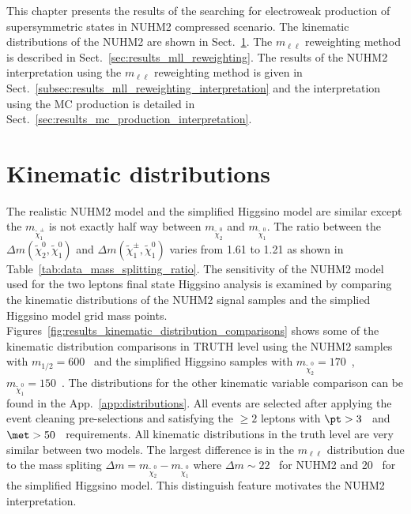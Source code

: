 This chapter presents the results of the searching for electroweak production of supersymmetric states in NUHM2 compressed scenario.
The kinematic distributions of the NUHM2 are shown in Sect.~\ref{sec:results_kinematic_distributions}.
The $m_{\ell \ell}$ reweighting method is described in Sect.~\ref{sec:results_mll_reweighting}.
The results of the NUHM2 interpretation using the $m_{\ell \ell}$ reweighting method is given in Sect.~\ref{subsec:results_mll_reweighting_interpretation} and the interpretation using the MC production is detailed in Sect.~\ref{sec:results_mc_production_interpretation}.


\section{Kinematic distributions}
\label{sec:results_kinematic_distributions}
The realistic NUHM2 model and the simplified Higgsino model are similar except the $m_{\widetilde{\chi}^{\pm}_{1}}$ is not exactly half way between $m_{\widetilde{\chi}^{0}_{2}}$ and $m_{\widetilde{\chi}^{0}_{1}}$.
The ratio between the $\Delta m(\widetilde{\chi}^{0}_{2}, \widetilde{\chi}^{0}_{1})$ and $\Delta m(\widetilde{\chi}^{\pm}_{1}, \widetilde{\chi}^{0}_{1})$ varies from 1.61 to 1.21 as shown in Table~\ref{tab:data_mass_splitting_ratio}.
The sensitivity of the NUHM2 model used for the two leptons final state Higgsino analysis is examined by comparing the kinematic distributions of the NUHM2 signal samples and the simplied Higgsino model grid mass points.
Figures~\ref{fig:results_kinematic_distribution_comparisons} shows some of the kinematic distribution comparisons in TRUTH level using the NUHM2 samples with $m_{1/2} = 600$~{\GeV} and the simplified Higgsino samples with $m_{\widetilde{\chi}^{0}_{2}} = 170$~{\GeV}, $m_{\widetilde{\chi}^{0}_{1}} = 150$~{\GeV}.
The distributions for the other kinematic variable comparison can be found in the App.~\ref{app:distributions}.
All events are selected after applying the event cleaning pre-selections and satisfying the $\ge 2$ leptons with $\pt > 3$~{\GeV} and $\met > 50$~{\GeV} requirements.
All kinematic distributions in the truth level are very similar between two models.
The largest difference is in the $m_{\ell \ell}$ distribution due to the mass spliting $\Delta m = m_{\widetilde{\chi}^{0}_{2}} - m_{\widetilde{\chi}^{0}_{1}}$ where $\Delta m \sim 22$~{\GeV} for NUHM2 and 20~{\GeV} for the simplified Higgsino model.
This distinguish feature motivates the NUHM2 interpretation.

